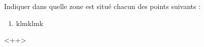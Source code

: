 
\begin{exercice}\label{exosmath-0987}

    Indiquer dans quelle zone est situé chacun des points suivants :
    \begin{enumerate}
        \item
    klmklmk           
    \end{enumerate}
    <++>


\begin{center}
   
\end{center}


\end{exercice}
